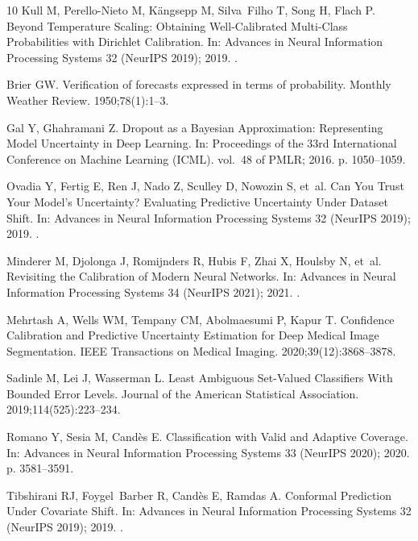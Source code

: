 \documentclass[VANCOUVER,Times1COL]{WileyNJDv5}
\begin{document}
\begin{thebibliography}{10}
Kull M, Perello-Nieto M, K{\"a}ngsepp M, Silva~Filho T, Song H, Flach P.
\newblock Beyond Temperature Scaling: Obtaining Well-Calibrated Multi-Class
  Probabilities with {D}irichlet Calibration.
\newblock In: Advances in Neural Information Processing Systems 32 (NeurIPS
  2019); 2019. .

Brier GW.
\newblock Verification of forecasts expressed in terms of probability.
\newblock Monthly Weather Review. 1950;78(1):1--3.

Gal Y, Ghahramani Z.
\newblock Dropout as a {B}ayesian Approximation: Representing Model Uncertainty
  in Deep Learning.
\newblock In: Proceedings of the 33rd International Conference on Machine
  Learning (ICML). vol.~48 of PMLR; 2016. p. 1050--1059.

Ovadia Y, Fertig E, Ren J, Nado Z, Sculley D, Nowozin S, et~al.
\newblock Can You Trust Your Model's Uncertainty? {E}valuating Predictive
  Uncertainty Under Dataset Shift.
\newblock In: Advances in Neural Information Processing Systems 32 (NeurIPS
  2019); 2019. .

Minderer M, Djolonga J, Romijnders R, Hubis F, Zhai X, Houlsby N, et~al.
\newblock Revisiting the Calibration of Modern Neural Networks.
\newblock In: Advances in Neural Information Processing Systems 34 (NeurIPS
  2021); 2021. .

Mehrtash A, Wells WM, Tempany CM, Abolmaesumi P, Kapur T.
\newblock Confidence Calibration and Predictive Uncertainty Estimation for Deep
  Medical Image Segmentation.
\newblock IEEE Transactions on Medical Imaging. 2020;39(12):3868--3878.

Sadinle M, Lei J, Wasserman L.
\newblock Least Ambiguous Set-Valued Classifiers With Bounded Error Levels.
\newblock Journal of the American Statistical Association.
  2019;114(525):223--234.

Romano Y, Sesia M, Cand{\`e}s E.
\newblock Classification with Valid and Adaptive Coverage.
\newblock In: Advances in Neural Information Processing Systems 33 (NeurIPS
  2020); 2020. p. 3581--3591.

Tibshirani RJ, Foygel~Barber R, Cand{\`e}s E, Ramdas A.
\newblock Conformal Prediction Under Covariate Shift.
\newblock In: Advances in Neural Information Processing Systems 32 (NeurIPS
  2019); 2019. .


\end{thebibliography}
\end{document}

